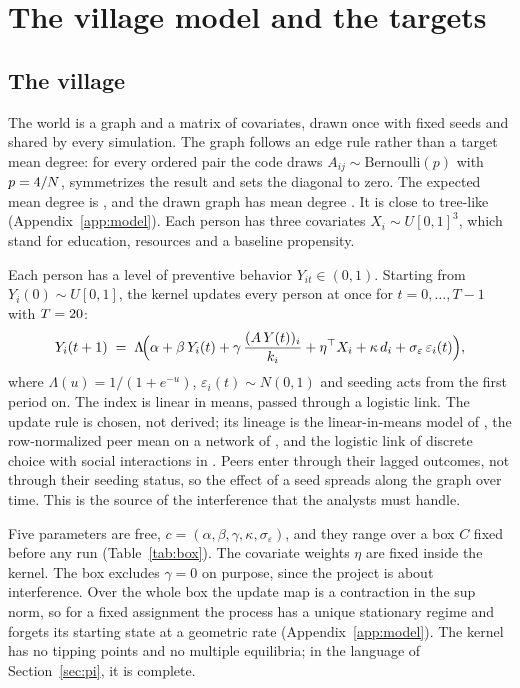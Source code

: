 \section{The village model and the targets}\label{sec:model}

\subsection{The village}

The world is a graph and a matrix of covariates, drawn once with fixed seeds and
shared by every simulation. The graph follows an edge rule rather than a target
mean degree: for every ordered pair the code draws
$A_{ij}\sim\mathrm{Bernoulli}(p)$ with $p=4/N$, symmetrizes the result
and sets the diagonal to zero. The expected mean degree is \MeanDegreeTheory{},
and the drawn graph has mean degree \MeanDegree{}. It is close to tree-like
(Appendix~\ref{app:model}). Each person has three
covariates $X_i\sim U[0,1]^3$, which stand for education, resources and a
baseline propensity.

Each person has a level of preventive behavior $Y_{it}\in(0,1)$. Starting from
$Y_i(0)\sim U[0,1]$, the kernel updates every person at once for
$t=0,\ldots,T-1$ with $T=20$:
\begin{equation}\label{eq:kernel}
  Y_i(t+1)
  \;=\;
  \Lambda\!\Bigl(
    \alpha + \beta\, Y_i(t)
    + \gamma\, \frac{(A\,Y(t))_i}{k_i}
    + \eta^\top X_i
    + \kappa\, d_i
    + \sigma_\varepsilon\,\varepsilon_i(t)
  \Bigr),
\end{equation}
where $\Lambda(u)=1/(1+e^{-u})$, $\varepsilon_i(t)\sim N(0,1)$ and seeding acts
from the first period on. The index is linear in means, passed through a
logistic link. The update rule is chosen, not derived; its lineage is the
linear-in-means model of \citet{manski1993}, the row-normalized peer mean on a
network of \citet{bramoulle2009}, and the logistic link of discrete choice with
social interactions in \citet{brock2001}. Peers enter through their lagged
outcomes, not through their seeding status, so the effect of a seed spreads along
the graph over time. This is the source of the interference that the analysts must
handle.

Five parameters are free, $c=(\alpha,\beta,\gamma,\kappa,\sigma_\varepsilon)$,
and they range over a box $C$ fixed before any run (Table~\ref{tab:box}). The
covariate weights $\eta$ are fixed inside the kernel. The box excludes $\gamma=0$
on purpose, since the project is about interference. Over the whole box the update
map is a contraction in the sup norm, so for a fixed assignment the process has a
unique stationary regime and forgets its starting state at a geometric rate
(Appendix~\ref{app:model}). The kernel has no tipping points and no multiple
equilibria; in the language of Section~\ref{sec:pi}, it is complete.


